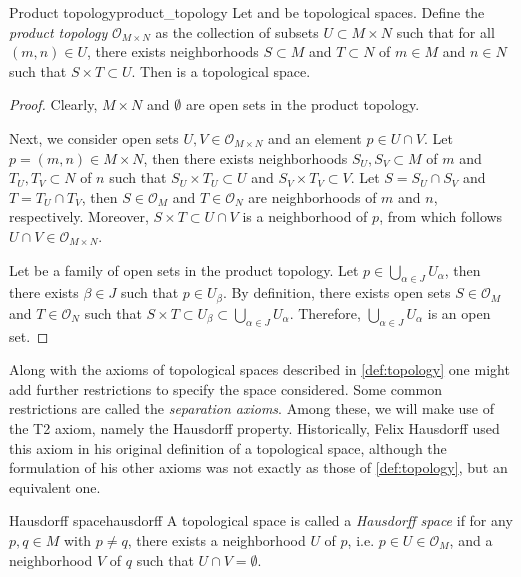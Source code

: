 \begin{proposition}{Product topology}{product_topology}
    Let  and  be topological spaces. Define the \emph{product topology} \(\mathcal{O}_{M\times N}\) as the collection of subsets \(U \subset M \times N\) such that for all \((m,n) \in U\), there exists neighborhoods \(S \subset M\) and \(T \subset N\) of \(m \in M\) and \(n\in N\) such that \(S \times T \subset U\). Then  is a topological space.
\end{proposition}
\begin{proof}
    Clearly, \(M\times N\) and \(\emptyset\) are open sets in the product topology.

    Next, we consider open sets \(U, V \in \mathcal{O}_{M\times N}\) and an element \(p \in U \cap V\). Let \(p = (m, n) \in M \times N\), then there exists neighborhoods \(S_U, S_V\subset M\) of \(m\) and \(T_U, T_V \subset N\) of \(n\) such that \(S_U \times T_U \subset U\) and \(S_V \times T_V \subset V\). Let \(S = S_U \cap S_V\) and \(T = T_U \cap T_V\), then \(S \in \mathcal{O}_M\) and \(T \in \mathcal{O}_N\) are neighborhoods of \(m\) and \(n\), respectively. Moreover, \(S \times T \subset U \cap V\) is a neighborhood of \(p\), from which follows \(U \cap V \in \mathcal{O}_{M\times N}\).

    Let  be a family of open sets in the product topology. Let \(p\in \bigcup_{\alpha\in J}U_\alpha\), then there exists \(\beta \in J\) such that \(p \in U_{\beta}\). By definition, there exists open sets \(S \in \mathcal{O}_M\) and \(T \in \mathcal{O}_N\) such that \(S \times T \subset U_\beta \subset \bigcup_{\alpha\in J} U_\alpha\). Therefore, \(\bigcup_{\alpha\in J}U_\alpha\) is an open set.
\end{proof}

Along with the axioms of topological spaces described in \cref{def:topology} one might add further restrictions to specify the space considered. Some common restrictions are called the \emph{separation axioms}. Among these, we will make use of the T2 axiom, namely the Hausdorff property. Historically, Felix Hausdorff used this axiom in his original definition of a topological space, although the formulation of his other axioms was not exactly as those of \cref{def:topology}, but an equivalent one.
\begin{definition}{Hausdorff space}{hausdorff}
    A topological space  is called a \emph{Hausdorff space} if for any \(p,q\in M\) with \(p\neq q\), there exists a neighborhood \(U\) of \(p\), i.e. \(p \in U \in \mathcal{O}_M\), and a neighborhood \(V\) of \(q\) such that \(U \cap V = \emptyset\).
\end{definition}

